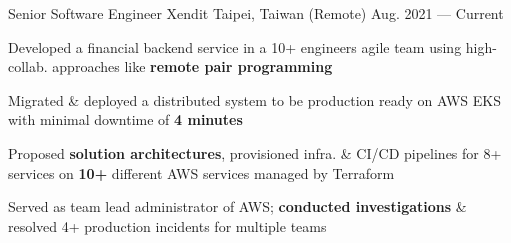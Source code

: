 

\begin{cventries}

\cventry
{Senior Software Engineer } %
{Xendit} %
{Taipei, Taiwan (Remote)} %
{Aug. 2021 --- Current} %
{
  \begin{cvitems} %
    \item {Developed a financial backend service in a 10+ engineers agile team using high-collab. approaches like \textbf{remote pair programming}}
    \item {Migrated \& deployed a distributed system to be production ready on AWS EKS with minimal downtime of \textbf{4 minutes}}
    \item {Proposed \textbf{solution architectures}, provisioned infra. \& CI/CD pipelines for 8+ services on \textbf{10+} different AWS services managed by Terraform}
    \item {Served as team lead administrator of AWS; \textbf{conducted investigations} \& resolved 4+ production incidents for multiple teams}
  \end{cvitems}
}


\end{cventries}

